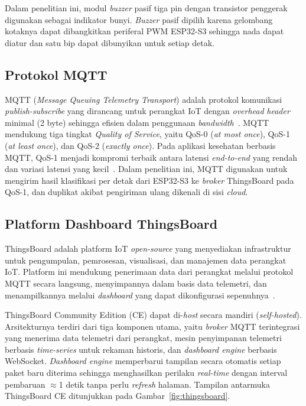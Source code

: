 Dalam penelitian ini, modul \textit{buzzer} pasif tiga pin dengan transistor penggerak digunakan sebagai indikator bunyi. \textit{Buzzer} pasif dipilih karena gelombang kotaknya dapat dibangkitkan periferal PWM ESP32-S3 sehingga nada dapat diatur dan satu bip dapat dibunyikan untuk setiap detak.

\subsection{Protokol MQTT}

MQTT (\textit{Message Queuing Telemetry Transport}) adalah protokol komunikasi \textit{publish-subscribe} yang dirancang untuk perangkat IoT dengan \textit{overhead} \textit{header} minimal (2 byte) sehingga efisien dalam penggunaan \textit{bandwidth}~\cite{oasis_mqtt5}. MQTT mendukung tiga tingkat \textit{Quality of Service}, yaitu QoS-0 (\textit{at most once}), QoS-1 (\textit{at least once}), dan QoS-2 (\textit{exactly once}). Pada aplikasi kesehatan berbasis MQTT, QoS-1 menjadi kompromi terbaik antara latensi \textit{end-to-end} yang rendah dan variasi latensi yang kecil~\cite{akshatha_2022}. Dalam penelitian ini, MQTT digunakan untuk mengirim hasil klasifikasi per detak dari ESP32-S3 ke \textit{broker} ThingsBoard pada QoS-1, dan duplikat akibat pengiriman ulang dikenali di sisi \textit{cloud}.

\subsection{Platform Dashboard ThingsBoard}

ThingsBoard adalah platform IoT \textit{open-source} yang menyediakan
infrastruktur untuk pengumpulan, pemrosesan, visualisasi, dan
manajemen data perangkat IoT. Platform ini mendukung penerimaan data dari
perangkat melalui protokol MQTT secara langsung, menyimpannya dalam basis
data telemetri, dan menampilkannya melalui \textit{dashboard} yang dapat
dikonfigurasi sepenuhnya~\cite{reoukadji_2025}.

ThingsBoard Community Edition (CE) dapat di-\textit{host} secara mandiri
(\textit{self-hosted}). Arsitekturnya terdiri dari tiga komponen utama, yaitu
\textit{broker} MQTT terintegrasi yang menerima data telemetri dari perangkat,
mesin penyimpanan telemetri berbasis \textit{time-series} untuk rekaman
historis, dan \textit{dashboard engine} berbasis WebSocket. \textit{Dashboard
engine} memperbarui tampilan secara otomatis setiap paket baru diterima
sehingga menghasilkan perilaku \textit{real-time} dengan interval pembaruan
$\approx$1 detik tanpa perlu \textit{refresh} halaman. Tampilan antarmuka
ThingsBoard CE ditunjukkan pada Gambar~\ref{fig:thingsboard}.

